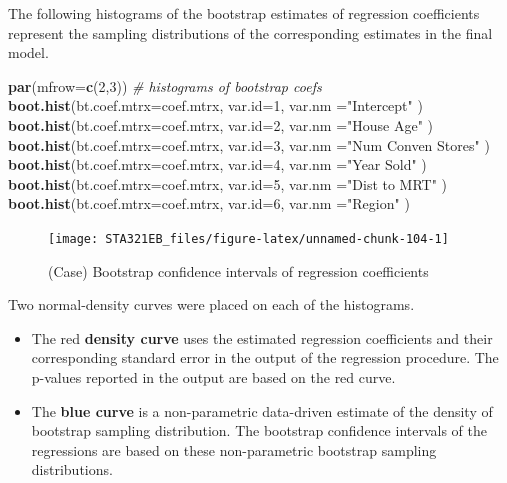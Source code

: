 \documentclass[
]{book}
\newenvironment{Shaded}{\begin{snugshade}}{\end{snugshade}}
\newcommand{\AttributeTok}[1]{\textcolor[rgb]{0.13,0.29,0.53}{#1}}
\newcommand{\CommentTok}[1]{\textcolor[rgb]{0.56,0.35,0.01}{\textit{#1}}}
\newcommand{\DecValTok}[1]{\textcolor[rgb]{0.00,0.00,0.81}{#1}}
\newcommand{\FunctionTok}[1]{\textcolor[rgb]{0.13,0.29,0.53}{\textbf{#1}}}
\newcommand{\NormalTok}[1]{#1}
\newcommand{\StringTok}[1]{\textcolor[rgb]{0.31,0.60,0.02}{#1}}
\begin{document}
The following histograms of the bootstrap estimates of regression coefficients represent the sampling distributions of the corresponding estimates in the final model.

\begin{Shaded}
\begin{Highlighting}[]
\FunctionTok{par}\NormalTok{(}\AttributeTok{mfrow=}\FunctionTok{c}\NormalTok{(}\DecValTok{2}\NormalTok{,}\DecValTok{3}\NormalTok{))  }\CommentTok{\# histograms of bootstrap coefs}
\FunctionTok{boot.hist}\NormalTok{(}\AttributeTok{bt.coef.mtrx=}\NormalTok{coef.mtrx, }\AttributeTok{var.id=}\DecValTok{1}\NormalTok{, }\AttributeTok{var.nm =}\StringTok{"Intercept"}\NormalTok{ )}
\FunctionTok{boot.hist}\NormalTok{(}\AttributeTok{bt.coef.mtrx=}\NormalTok{coef.mtrx, }\AttributeTok{var.id=}\DecValTok{2}\NormalTok{, }\AttributeTok{var.nm =}\StringTok{"House Age"}\NormalTok{ )}
\FunctionTok{boot.hist}\NormalTok{(}\AttributeTok{bt.coef.mtrx=}\NormalTok{coef.mtrx, }\AttributeTok{var.id=}\DecValTok{3}\NormalTok{, }\AttributeTok{var.nm =}\StringTok{"Num Conven Stores"}\NormalTok{ )}
\FunctionTok{boot.hist}\NormalTok{(}\AttributeTok{bt.coef.mtrx=}\NormalTok{coef.mtrx, }\AttributeTok{var.id=}\DecValTok{4}\NormalTok{, }\AttributeTok{var.nm =}\StringTok{"Year Sold"}\NormalTok{ )}
\FunctionTok{boot.hist}\NormalTok{(}\AttributeTok{bt.coef.mtrx=}\NormalTok{coef.mtrx, }\AttributeTok{var.id=}\DecValTok{5}\NormalTok{, }\AttributeTok{var.nm =}\StringTok{"Dist to MRT"}\NormalTok{ )}
\FunctionTok{boot.hist}\NormalTok{(}\AttributeTok{bt.coef.mtrx=}\NormalTok{coef.mtrx, }\AttributeTok{var.id=}\DecValTok{6}\NormalTok{, }\AttributeTok{var.nm =}\StringTok{"Region"}\NormalTok{ )}
\end{Highlighting}
\end{Shaded}

\begin{figure}

{\centering \texttt{[image: STA321EB\_files/figure-latex/unnamed-chunk-104-1]} 

}

\caption{(Case) Bootstrap confidence intervals of regression coefficients}\label{fig:unnamed-chunk-104}
\end{figure}

Two normal-density curves were placed on each of the histograms.

\begin{itemize}
\item
  The red \textbf{density curve} uses the estimated regression coefficients and their corresponding standard error in the output of the regression procedure. The p-values reported in the output are based on the red curve.
\item
  The \textbf{blue curve} is a non-parametric data-driven estimate of the density of bootstrap sampling distribution. The bootstrap confidence intervals of the regressions are based on these non-parametric bootstrap sampling distributions.
\end{itemize}
\end{document}

